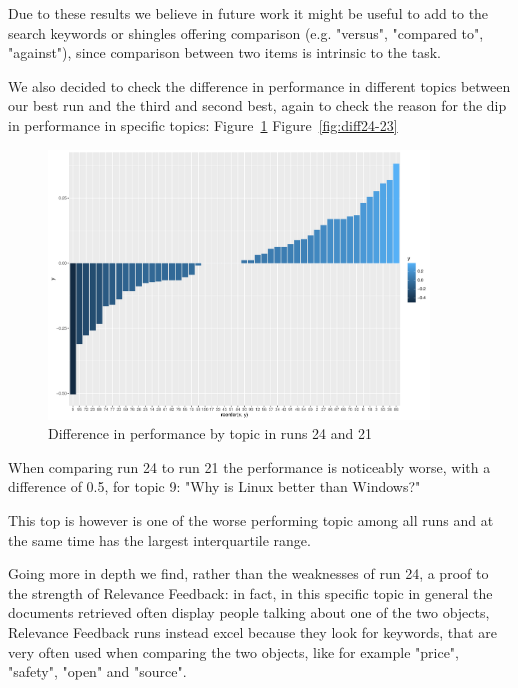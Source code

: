 Due to these results we believe in future work it might be useful to add  to the search keywords or shingles offering comparison (e.g. "versus", "compared to", "against"), since comparison between two items is intrinsic to the task.

We also decided to check the difference in performance in different topics between our best run and the third and second best, again to check the reason for the dip in performance in specific topics: Figure~\ref{fig:diff24-21} Figure~\ref{fig:diff24-23}

\begin{figure}[h]
\centering
\includegraphics[width=0.9\textwidth]{figure/rundiff24-21.pdf}
\caption{Difference in performance by topic in runs 24 and 21}
\label{fig:diff24-21}
\end{figure}

When comparing run 24 to run 21 the performance is noticeably worse, with a difference of 0.5, for topic 9:  "Why is Linux better than Windows?"

This top is however is one of the worse performing topic among all runs and at the same time has the largest interquartile range.

Going more in depth we find, rather than the weaknesses of run 24, a proof to the strength of Relevance Feedback: in fact, in this specific topic in general the documents retrieved often display people talking about one of the two objects, Relevance Feedback runs instead excel because they look for keywords, that are very often used when comparing the two objects, like for example "price", "safety", "open" and "source".\newline

